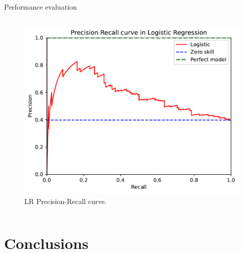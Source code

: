 \documentclass[aspectratio=169,xcolor=dvipsnames,handout]{beamer}
\begin{document}
\begin{frame}{Performance evaluation}
\begin{columns}[c]
        \centering
        \begin{figure}[htpb]
            \centering
            \includegraphics[width=\textwidth]{precision_recall_curve_LR}
            \caption{LR Precision-Recall curve.}
        \end{figure}
        
    \end{columns}
\end{frame}

\section{Conclusions}
\end{document}
